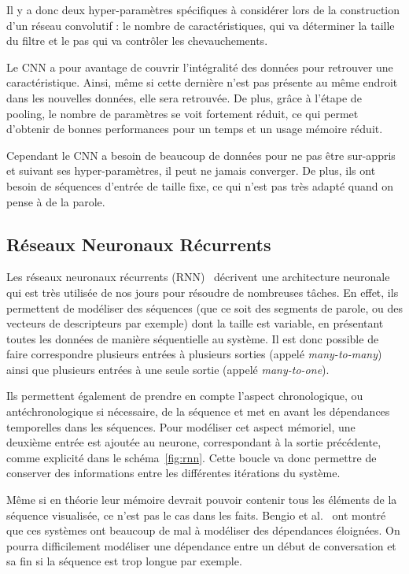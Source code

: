 Il y a donc deux hyper-paramètres spécifiques à considérer lors de la construction d'un réseau convolutif : le nombre de caractéristiques, qui va déterminer la taille du filtre et le pas qui va contrôler les chevauchements.

Le CNN a pour avantage de couvrir l'intégralité des données pour retrouver une caractéristique. Ainsi, même si cette dernière n'est pas présente au même endroit dans les nouvelles données, elle sera retrouvée. De plus, grâce à l'étape de pooling, le nombre de paramètres se voit fortement réduit, ce qui permet d'obtenir de bonnes performances pour un temps et un usage mémoire réduit.

Cependant le CNN a besoin de beaucoup de données pour ne pas être sur-appris et suivant ses hyper-paramètres, il peut ne jamais converger. De plus, ils ont besoin de séquences d'entrée de taille fixe, ce qui n'est pas très adapté quand on pense à de la parole.

\subsection{Réseaux Neuronaux Récurrents}


Les réseaux neuronaux récurrents (RNN)~\cite{Jordan1986} décrivent une architecture neuronale qui est très utilisée de nos jours pour résoudre de nombreuses tâches. En effet, ils permettent de modéliser des séquences (que ce soit des segments de parole, ou des vecteurs de descripteurs par exemple) dont la taille est variable, en présentant toutes les données de manière séquentielle au système. Il est donc possible de faire correspondre plusieurs entrées à plusieurs sorties (appelé \textit{many-to-many}) ainsi que plusieurs entrées à une seule sortie (appelé \textit{many-to-one}). %

Ils permettent également de prendre en compte l'aspect chronologique, ou antéchronologique si nécessaire, de la séquence et met en avant les dépendances temporelles dans les séquences.
Pour modéliser cet aspect mémoriel, une deuxième entrée est ajoutée au neurone, correspondant à la sortie précédente, comme explicité dans le schéma~\ref{fig:rnn}. Cette boucle va donc permettre de conserver des informations entre les différentes itérations du système.

Même si en théorie leur mémoire devrait pouvoir contenir tous les éléments de la séquence visualisée, ce n'est pas le cas dans les faits. Bengio et al.~\cite{Bengio1994} ont montré que ces systèmes ont beaucoup de mal à modéliser des dépendances éloignées. On pourra difficilement modéliser une dépendance entre un début de conversation et sa fin si la séquence est trop longue par exemple.

